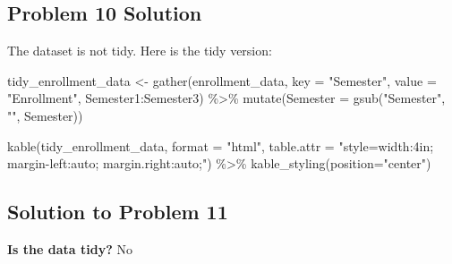 \documentclass[
  letterpaper,
  DIV=11,
  numbers=noendperiod]{scrreprt}
\newenvironment{Shaded}{\begin{snugshade}}{\end{snugshade}}
\newcommand{\AttributeTok}[1]{\textcolor[rgb]{0.40,0.45,0.13}{#1}}
\newcommand{\FunctionTok}[1]{\textcolor[rgb]{0.28,0.35,0.67}{#1}}
\newcommand{\NormalTok}[1]{\textcolor[rgb]{0.00,0.23,0.31}{#1}}
\newcommand{\OtherTok}[1]{\textcolor[rgb]{0.00,0.23,0.31}{#1}}
\newcommand{\SpecialCharTok}[1]{\textcolor[rgb]{0.37,0.37,0.37}{#1}}
\newcommand{\StringTok}[1]{\textcolor[rgb]{0.13,0.47,0.30}{#1}}
\begin{document}
\subsection*{Problem 10 Solution}\label{problem-10-solution}

The dataset is not tidy. Here is the tidy version:

\begin{Shaded}
\begin{Highlighting}[]
\NormalTok{tidy\_enrollment\_data }\OtherTok{\textless{}{-}} \FunctionTok{gather}\NormalTok{(enrollment\_data, }\AttributeTok{key =} \StringTok{"Semester"}\NormalTok{, }\AttributeTok{value =} \StringTok{"Enrollment"}\NormalTok{, Semester1}\SpecialCharTok{:}\NormalTok{Semester3) }\SpecialCharTok{\%\textgreater{}\%}
  \FunctionTok{mutate}\NormalTok{(}\AttributeTok{Semester =} \FunctionTok{gsub}\NormalTok{(}\StringTok{"Semester"}\NormalTok{, }\StringTok{""}\NormalTok{, Semester))}

\FunctionTok{kable}\NormalTok{(tidy\_enrollment\_data, }\AttributeTok{format =} \StringTok{"html"}\NormalTok{, }\AttributeTok{table.attr =} \StringTok{"style=\textquotesingle{}width:4in; margin{-}left:auto; margin.right:auto;\textquotesingle{}"}\NormalTok{)  }\SpecialCharTok{\%\textgreater{}\%}
  \FunctionTok{kable\_styling}\NormalTok{(}\AttributeTok{position=}\StringTok{"center"}\NormalTok{)}
\end{Highlighting}
\end{Shaded}

\subsection*{Solution to Problem 11}\label{solution-to-problem-11}

\textbf{Is the data tidy?} No

\begin{Shaded}
\end{Shaded}
\end{document}
